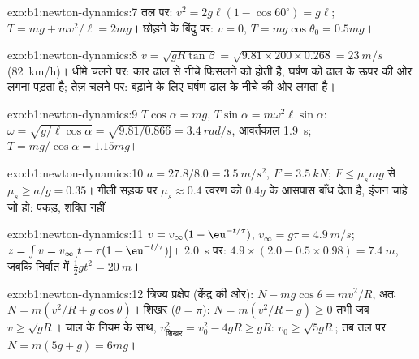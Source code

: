 \begin{solution}{exo:b1:newton-dynamics:7}
तल पर: $v^2 = 2g\ell(1 - \cos 60^\circ) = g\ell$; $T = mg + mv^2/\ell =
2mg$। छोड़ने के बिंदु पर: $v = 0$, $T = mg\cos\theta_0 = 0.5mg$।
\end{solution}

\begin{solution}{exo:b1:newton-dynamics:8}
$v = \sqrt{gR\tan\beta} = \sqrt{9.81 \times 200 \times 0.268} = \qty{23}{m/s}$
(\qty{82}{km/h})। धीमे चलने पर: कार ढाल से नीचे फिसलने को होती है, घर्षण को
ढाल के ऊपर की ओर लगना पड़ता है; तेज़ चलने पर:  बढ़ाने के लिए
घर्षण ढाल के नीचे की ओर लगता है।
\end{solution}

\begin{solution}{exo:b1:newton-dynamics:9}
$T\cos\alpha = mg$, $T\sin\alpha = m\omega^2\ell\sin\alpha$: $\omega =
\sqrt{g/\ell\cos\alpha} = \sqrt{9.81/0.866} = \qty{3.4}{rad/s}$, आवर्तकाल
\qty{1.9}{s}; $T = mg/\cos\alpha = 1.15mg$।
\end{solution}

\begin{solution}{exo:b1:newton-dynamics:10}
$a = 27.8/8.0 = \qty{3.5}{m/s^2}$, $F = \qty{3.5}{kN}$; $F \leq \mu_smg$
से $\mu_s \geq a/g = 0.35$। गीली सड़क पर $\mu_s \approx 0.4$ त्वरण को
$0.4g$ के आसपास बाँध देता है, इंजन चाहे जो हो: पकड़, शक्ति नहीं।
\end{solution}

\begin{solution}{exo:b1:newton-dynamics:11}
$v = v_\infty(1 - \eu^{-t/\tau})$, $v_\infty = g\tau = \qty{4.9}{m/s}$;
$z = \int v = v_\infty[t - \tau(1 - \eu^{-t/\tau})]$। \qty{2.0}{s} पर:
$4.9 \times (2.0 - 0.5 \times 0.98) = \qty{7.4}{m}$, जबकि निर्वात में $\tfrac12 gt^2
= \qty{20}{m}$।
\end{solution}

\begin{solution}{exo:b1:newton-dynamics:12}
त्रिज्य प्रक्षेप (केंद्र की ओर): $N - mg\cos\theta = mv^2/R$, अतः
$N = m(v^2/R + g\cos\theta)$। शिखर ($\theta = \pi$): $N = m(v^2/R - g)
\geq 0$ तभी जब $v \geq \sqrt{gR}$। चाल के नियम के साथ, $v_{\text{शिखर}}^2 =
v_0^2 - 4gR \geq gR$: $v_0 \geq \sqrt{5gR}$; तब तल पर $N =
m(5g + g) = 6mg$।
\end{solution}

